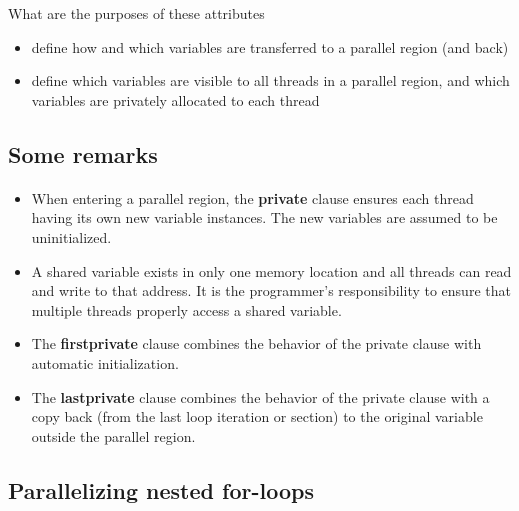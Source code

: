 \documentclass[%
oneside,                 %
final,                   %
10pt]{article}
\begin{document}
\noindent
What are the purposes of these attributes
\begin{itemize}
\item define how and which variables are transferred to a parallel region (and back)

\item define which variables are visible to all threads in a parallel region, and which variables are privately allocated to each thread
\end{itemize}

\noindent



\subsection*{Some remarks}

\paragraph{}

\begin{itemize}
\item When entering a parallel region, the \textbf{private} clause ensures each thread having its own new variable instances. The new variables are assumed to be uninitialized.

\item A shared variable exists in only one memory location and all threads can read and write to that address. It is the programmer's responsibility to ensure that multiple threads properly access a shared variable.

\item The \textbf{firstprivate} clause combines the behavior of the private clause with automatic initialization.

\item The \textbf{lastprivate} clause combines the behavior of the private clause with a copy back (from the last loop iteration or section) to the original variable outside the parallel region.
\end{itemize}

\noindent



\subsection*{Parallelizing nested for-loops}
\end{document}
